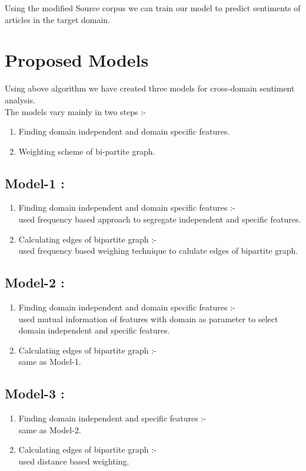 \documentclass{report}
\begin{document}
Using the modified Source corpus we can train our model to predict sentiments of articles in the target domain.\\


\chapter{Proposed Models}

Using above algorithm we have created three models for cross-domain sentiment analysis.\\
The models vary mainly in two steps :-
\begin{enumerate}
\item Finding domain independent and domain specific features.
\item Weighting scheme of bi-partite graph.
\end{enumerate}

\section{Model-1 :}
\begin{enumerate}
\item Finding domain independent and domain specific features :-\\
used frequency based approach to segregate independent and specific features.
\item Calculating edges of bipartite graph :-\\
used frequency based weighing technique to calulate edges of bipartite graph.
\end{enumerate}
\section{Model-2 :}
\begin{enumerate}
\item Finding domain independent and domain specific features :-\\
used mutual information of features with domain as parameter to select domain independent and specific features.
\item Calculating edges of bipartite graph :-\\
same as Model-1.
\end{enumerate}
\section{Model-3 :}
\begin{enumerate}
\item Finding domain independent and specific features :-\\
same as Model-2.
\item Calculating edges of bipartite graph :-\\
used distance based weighting.
\end{enumerate}
\end{document}
